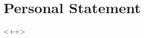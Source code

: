 \documentclass[a4paper]{article}
\begin{document}
\section*{\centering \textcolor{purply}{Personal Statement}}%
<++>
\end{document}
